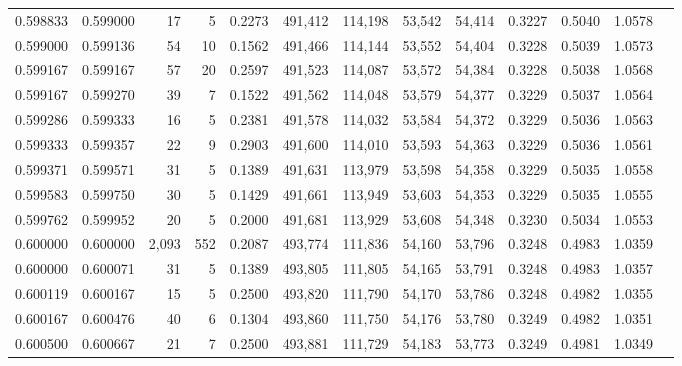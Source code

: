 \begin{tabular}{rrrrrrrrrrrrr}
0.598833 & 0.599000 &    17 &   5 &                                     0.2273 & 491,412 & 114,198 &  53,542 &  54,414 & 0.3227 & 0.5040 & 1.0578 \\
0.599000 & 0.599136 &    54 &  10 &                                     0.1562 & 491,466 & 114,144 &  53,552 &  54,404 & 0.3228 & 0.5039 & 1.0573 \\
0.599167 & 0.599167 &    57 &  20 &                                     0.2597 & 491,523 & 114,087 &  53,572 &  54,384 & 0.3228 & 0.5038 & 1.0568 \\
0.599167 & 0.599270 &    39 &   7 &                                     0.1522 & 491,562 & 114,048 &  53,579 &  54,377 & 0.3229 & 0.5037 & 1.0564 \\
0.599286 & 0.599333 &    16 &   5 &                                     0.2381 & 491,578 & 114,032 &  53,584 &  54,372 & 0.3229 & 0.5036 & 1.0563 \\
0.599333 & 0.599357 &    22 &   9 &                                     0.2903 & 491,600 & 114,010 &  53,593 &  54,363 & 0.3229 & 0.5036 & 1.0561 \\
0.599371 & 0.599571 &    31 &   5 &                                     0.1389 & 491,631 & 113,979 &  53,598 &  54,358 & 0.3229 & 0.5035 & 1.0558 \\
0.599583 & 0.599750 &    30 &   5 &                                     0.1429 & 491,661 & 113,949 &  53,603 &  54,353 & 0.3229 & 0.5035 & 1.0555 \\
0.599762 & 0.599952 &    20 &   5 &                                     0.2000 & 491,681 & 113,929 &  53,608 &  54,348 & 0.3230 & 0.5034 & 1.0553 \\
0.600000 & 0.600000 & 2,093 & 552 &                                     0.2087 & 493,774 & 111,836 &  54,160 &  53,796 & 0.3248 & 0.4983 & 1.0359 \\
0.600000 & 0.600071 &    31 &   5 &                                     0.1389 & 493,805 & 111,805 &  54,165 &  53,791 & 0.3248 & 0.4983 & 1.0357 \\
0.600119 & 0.600167 &    15 &   5 &                                     0.2500 & 493,820 & 111,790 &  54,170 &  53,786 & 0.3248 & 0.4982 & 1.0355 \\
0.600167 & 0.600476 &    40 &   6 &                                     0.1304 & 493,860 & 111,750 &  54,176 &  53,780 & 0.3249 & 0.4982 & 1.0351 \\
0.600500 & 0.600667 &    21 &   7 &                                     0.2500 & 493,881 & 111,729 &  54,183 &  53,773 & 0.3249 & 0.4981 & 1.0349 \\

\end{tabular}
